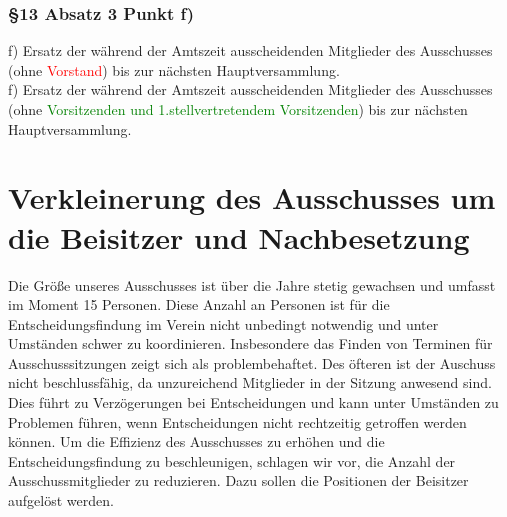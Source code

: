 \documentclass[10pt,a4paper,parskip=half]{scrartcl}
\newcommand{\new}[1]{\textcolor{Green}{#1}}
\newcommand{\old}[1]{\textcolor{Red}{#1}}
\newcommand{\change}[1]{
  \begin{adjustwidth}{20pt}{20pt}
    #1
  \end{adjustwidth}
}
\newcommand{\compare}[3]{\change{\subsubsection*{#1}\begin{multicols}{2}#2\columnbreak\\#3\end{multicols}}}
\begin{document}
\compare{§13 Absatz 3 Punkt f)}
{f) Ersatz der während der Amtszeit ausscheidenden Mitglieder des Ausschusses (ohne \old{Vorstand}) bis zur nächsten Hauptversammlung.}
{f) Ersatz der während der Amtszeit ausscheidenden Mitglieder des Ausschusses (ohne \new{Vorsitzenden und 1.stellvertretendem Vorsitzenden}) bis zur nächsten Hauptversammlung.}


\clearpage
\section{Verkleinerung des Ausschusses um die Beisitzer und Nachbesetzung}
Die Größe unseres Ausschusses ist über die Jahre stetig gewachsen und umfasst im Moment 15 Personen. Diese Anzahl an Personen ist für die Entscheidungsfindung im Verein nicht unbedingt notwendig und unter Umständen schwer zu koordinieren. Insbesondere das Finden von Terminen für Ausschusssitzungen zeigt sich als problembehaftet. Des öfteren ist der Auschuss nicht beschlussfähig, da unzureichend Mitglieder in der Sitzung anwesend sind. Dies führt zu Verzögerungen bei Entscheidungen und kann unter Umständen zu Problemen führen, wenn Entscheidungen nicht rechtzeitig getroffen werden können. Um die Effizienz des Ausschusses zu erhöhen und die Entscheidungsfindung zu beschleunigen, schlagen wir vor, die Anzahl der Ausschussmitglieder zu reduzieren. Dazu sollen die Positionen der Beisitzer aufgelöst werden.
\end{document}
